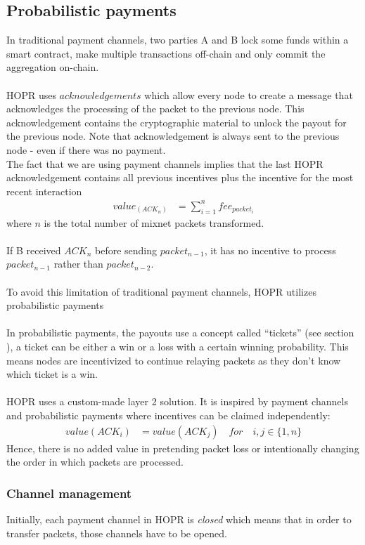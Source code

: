\subsection{Probabilistic payments}
In traditional payment channels, two parties A and B lock some funds within a smart contract, make multiple transactions off-chain and only commit the aggregation on-chain.
\\~\\HOPR uses $acknowledgements$ which allow every node to create a message that acknowledges the processing of the packet to the previous node. This acknowledgement contains the cryptographic material to unlock the payout for the previous node. Note that acknowledgement is always sent to the previous node - even if there was no payment.
\\The fact that we are using payment channels implies that the last HOPR acknowledgement contains all previous incentives plus the incentive for the most recent interaction
\begin{align}  
value_(ACK_n) &=\sum_{i=1}^nfee_{packet_i}
     \end{align}
where $n$ is the total number of mixnet packets transformed.
\\~\\If B received $ACK_n$ before sending $packet_{n-1}$, it has no incentive to process $packet_{n-1}$ rather than $packet_{n-2}$.
\\~\\To avoid this limitation of traditional payment channels, HOPR utilizes probabilistic payments
\\~\\In probabilistic payments, the payouts use a concept called “tickets” (see section ), a ticket can be either a win or a loss with a certain winning probability. This means nodes are incentivized to continue relaying packets as they don’t know which ticket is a win.
\\~\\HOPR uses a custom-made layer 2 solution. It is inspired by payment channels and probabilistic payments where incentives can be claimed independently:
\begin{align}  
 value ( ACK_i )  &  =value ( ACK_j ) \quad for \quad i,j\in \{1,n\}
         \end{align}
Hence, there is no added value in pretending packet loss or intentionally changing the order in which packets are processed.
\subsubsection{Channel management}
Initially, each payment channel in HOPR is \textit{closed} which means that in order to transfer packets, those channels have to be opened.
